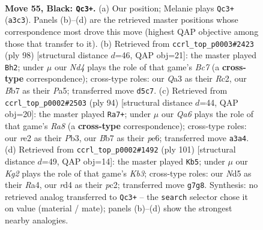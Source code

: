 \documentclass[11pt]{article}
\begin{document}
\clearpage

\begin{figure}[p]\centering
\begin{subfigure}{0.46\textwidth}\centering
\resizebox{\linewidth}{!}{%
\newchessgame
\chessboard[
  setfen={8/1b3pk1/6p1/3n4/2KR3P/q7/4R2P/5N2 b - - 18 55},
  showmover=false,
  pgfstyle=straightmove, color=movearrow, markmove={a3-c3}
]}
\caption{}
\end{subfigure}\hfill
\begin{subfigure}{0.46\textwidth}\centering
\resizebox{\linewidth}{!}{%
\newchessgame
\chessboard[
  setfen={8/2Bk4/4pb2/Pp1r3p/8/1KP5/2R5/8 w - - 1 50},
  showmover=false,
  pgfstyle=straightmove, color=movearrow, markmove={c7-h2}
]}
\caption{}
\end{subfigure}
\\[4pt]
\begin{subfigure}{0.46\textwidth}\centering
\resizebox{\linewidth}{!}{%
\newchessgame
\chessboard[
  setfen={R7/4k1p1/4p1P1/4r3/4N3/1P3n2/2P5/3K4 w - - 3 48},
  showmover=false,
  pgfstyle=straightmove, color=movearrow, markmove={a8-a7}
]}
\caption{}
\end{subfigure}\hfill
\begin{subfigure}{0.46\textwidth}\centering
\resizebox{\linewidth}{!}{%
\newchessgame
\chessboard[
  setfen={8/1p6/1kp5/8/r2P4/1K4p1/2PR2P1/8 b - - 1 51},
  showmover=false,
  pgfstyle=straightmove, color=movearrow, markmove={b6-b5}
]}
\caption{}
\end{subfigure}
\caption{\textbf{Move 55, Black: \texttt{Qc3+}.} (a) Our position; Melanie plays \texttt{Qc3+} (\texttt{a3c3}). Panels (b)--(d) are the retrieved master positions whose correspondence most drove this move (highest QAP objective among those that transfer to it). (b) Retrieved from \texttt{ccrl\_top\_p0003\#2423} (ply 98) [structural distance $d$=46, QAP obj=21]: the master played \texttt{Bh2}; under $\mu$ our \emph{Nd4} plays the role of that game's \emph{Bc7} (a \textbf{cross-type} correspondence); cross-type roles: our \emph{Q}a3 as their \emph{R}c2, our \emph{B}b7 as their \emph{P}a5; transferred move \texttt{d5c7}. (c) Retrieved from \texttt{ccrl\_top\_p0002\#2503} (ply 94) [structural distance $d$=44, QAP obj=20]: the master played \texttt{Ra7+}; under $\mu$ our \emph{Qa6} plays the role of that game's \emph{Ra8} (a \textbf{cross-type} correspondence); cross-type roles: our \emph{r}e2 as their \emph{P}b3, our \emph{B}b7 as their \emph{p}e6; transferred move \texttt{a3a4}. (d) Retrieved from \texttt{ccrl\_top\_p0002\#1492} (ply 101) [structural distance $d$=49, QAP obj=14]: the master played \texttt{Kb5}; under $\mu$ our \emph{Kg2} plays the role of that game's \emph{Kb3}; cross-type roles: our \emph{N}d5 as their \emph{R}a4, our \emph{r}d4 as their \emph{p}c2; transferred move \texttt{g7g8}. Synthesis: no retrieved analog transferred to \texttt{Qc3+} -- the \texttt{search} selector chose it on value (material / mate); panels (b)--(d) show the strongest nearby analogies.}
\label{fig:thought-m109}
\end{figure}
\end{document}
